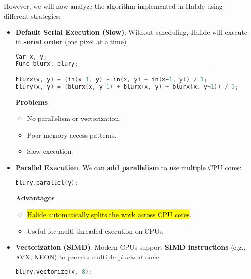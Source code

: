 \highspace
However, we will now analyze the algorithm implemented in Halide using different strategies:
\begin{itemize}
    \item[\textcolor{Red2}{\faIcon{hourglass-half}}] \textcolor{Red2}{\textbf{Default Serial Execution (Slow)}}. Without scheduling, Halide will execute in \textbf{serial order} (one pixel at a time).
    \begin{lstlisting}[language=c++]
Var x, y;
Func blurx, blury;

blurx(x, y) = (in(x-1, y) + in(x, y) + in(x+1, y)) / 3;
blury(x, y) = (blurx(x, y-1) + blurx(x, y) + blurx(x, y+1)) / 3;\end{lstlisting}
    \begin{flushleft}
        \textcolor{Red2}{ \textbf{Problems}}
    \end{flushleft}
    \begin{itemize}[label=\textcolor{Red2}{}]
        \item No parallelism or vectorization.
        \item Poor memory access patterns.
        \item Slow execution.
    \end{itemize}


    \item[\textcolor{Red2}{\faIcon{\speedIcon}}] \textcolor{Red2}{\textbf{Parallel Execution}}. We can \textbf{add parallelism} to use multiple CPU cores:
    \begin{lstlisting}[language=c++]
blury.parallel(y);\end{lstlisting}
    
    \begin{flushleft}
        \textcolor{Green3}{ \textbf{Advantages}}
    \end{flushleft}
    \begin{itemize}[label=\textcolor{Green3}{}]
        \item \hl{Halide automatically splits the work across CPU cores}.
        \item Useful for multi-threaded execution on CPUs.
    \end{itemize}

    
    \item[\textcolor{Red2}{\faIcon{\speedIcon}}] \textcolor{Red2}{\textbf{Vectorization (SIMD)}}. Modern CPUs support \textbf{SIMD instructions} (e.g., AVX, NEON) to process multiple pixels at once:
    \begin{lstlisting}[language=c++]
blury.vectorize(x, 8);\end{lstlisting}


\end{itemize}
